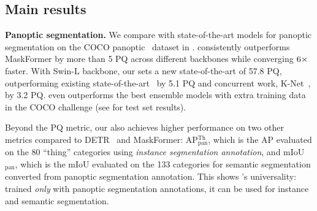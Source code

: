 \subsection{Main results}

\noindent\textbf{Panoptic segmentation.} We compare \modelname with state-of-the-art models for panoptic segmentation on the COCO panoptic~\cite{kirillov2017panoptic} dataset in . \modelname consistently outperforms MaskFormer by more than 5 PQ across different backbones while converging $6\times$ faster. With Swin-L backbone,
our \modelname sets a new state-of-the-art of 57.8 PQ, outperforming existing state-of-the-art~\cite{cheng2021maskformer} by 5.1 PQ and concurrent work, K-Net~\cite{zhang2021knet}, by 3.2 PQ.
\modelname even outperforms the best ensemble models with extra training data in the COCO challenge (see  for test set results).

Beyond the PQ metric, our \modelname also achieves higher performance on two other metrics compared to DETR~\cite{detr} and MaskFormer: AP$^\text{Th}_\text{pan}$, which is the AP evaluated on the 80 ``thing'' categories using \emph{instance segmentation annotation}, and mIoU$_\text{pan}$, which is the mIoU evaluated on the 133 categories for semantic segmentation converted from panoptic segmentation annotation. This shows \modelname's universality: %
trained \emph{only} with panoptic segmentation annotations, it can be used for instance and semantic segmentation.

